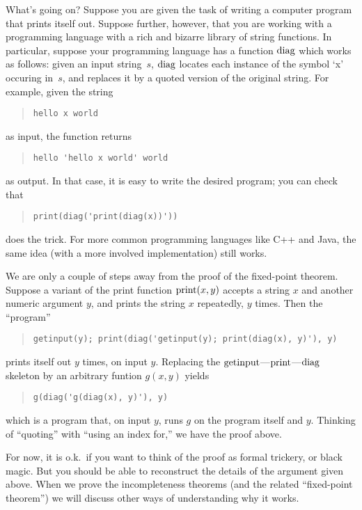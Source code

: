 \documentclass[../../../include/open-logic-section]{subfiles}
\begin{document}
\begin{explain}
What's going on? Suppose you are given the task of writing a computer
program that prints itself out. Suppose further, however, that you are
working with a programming language with a rich and bizarre library of
string functions. In particular, suppose your programming language has
a function $\mathrm{diag}$ which works as follows: given an input
string~$s$, $\mathrm{diag}$ locates each instance of the symbol `x'
occuring in~$s$, and replaces it by a quoted version of the original
string. For example, given the string
\begin{quote}
\begin{verbatim}
hello x world
\end{verbatim}
\end{quote}
as input, the function returns
\begin{quote}
\begin{verbatim}
hello 'hello x world' world
\end{verbatim}
\end{quote}
as output. In that case, it is easy to write the desired program; you
can check that
\begin{quote}
\begin{verbatim}
print(diag('print(diag(x))'))
\end{verbatim}
\end{quote}
does the trick. For more common programming languages like C++ and
Java, the same idea (with a more involved implementation) still works.

We are only a couple of steps away from the proof of the fixed-point
theorem. Suppose a variant of the print function $\mathrm{print}(x,y)$
accepts a string $x$ and another numeric argument $y$, and prints the
string $x$ repeatedly, $y$ times. Then the ``program''
\begin{quote}
\begin{verbatim}
getinput(y); print(diag('getinput(y); print(diag(x), y)'), y)
\end{verbatim}
\end{quote}
prints itself out $y$ times, on input $y$. Replacing the
$\mathrm{getinput}$---$\mathrm{print}$---$\mathrm{diag}$ skeleton by an
arbitrary funtion $g(x,y)$ yields
\begin{quote}
\begin{verbatim}
g(diag('g(diag(x), y)'), y)
\end{verbatim}
\end{quote}
which is a program that, on input $y$, runs $g$ on the program itself
and $y$. Thinking of ``quoting'' with ``using an index for,'' we have
the proof above.

For now, it is o.k.\ if you want to think of the proof as formal
trickery, or black magic. But you should be able to reconstruct the
details of the argument given above. When we prove the incompleteness
theorems (and the related ``fixed-point theorem'') we will discuss
other ways of understanding why it works.
\end{explain}
\end{document}
